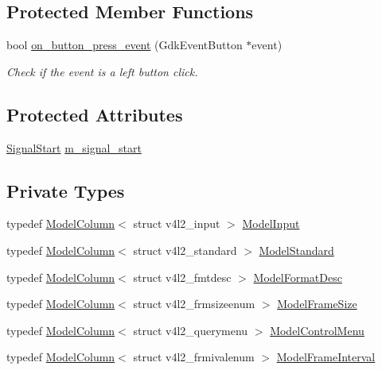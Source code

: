 \subsection*{Protected Member Functions}
\begin{DoxyCompactItemize}
\item 
bool \hyperlink{class_v_s_s_s___g_u_i_1_1_v4_l_interface_adf76dc7c716d55604384a0fd447fdd5d}{on\+\_\+button\+\_\+press\+\_\+event} (Gdk\+Event\+Button $\ast$event)
\begin{DoxyCompactList}\small\item\em Check if the event is a left button click. \end{DoxyCompactList}\end{DoxyCompactItemize}
\subsection*{Protected Attributes}
\begin{DoxyCompactItemize}
\item 
\hyperlink{class_v_s_s_s___g_u_i_1_1_v4_l_interface_aaa97121c9564dbb8c0717725a795ed15}{Signal\+Start} \hyperlink{class_v_s_s_s___g_u_i_1_1_v4_l_interface_a106a19f83b60b118984f3aece410d140}{m\+\_\+signal\+\_\+start}
\end{DoxyCompactItemize}
\subsection*{Private Types}
\begin{DoxyCompactItemize}
\item 
typedef \hyperlink{class_v_s_s_s___g_u_i_1_1_v4_l_interface_1_1_model_column}{Model\+Column}$<$ struct v4l2\+\_\+input $>$ \hyperlink{class_v_s_s_s___g_u_i_1_1_v4_l_interface_a1595c870c26f3848005f8211eeb67b18}{Model\+Input}
\item 
typedef \hyperlink{class_v_s_s_s___g_u_i_1_1_v4_l_interface_1_1_model_column}{Model\+Column}$<$ struct v4l2\+\_\+standard $>$ \hyperlink{class_v_s_s_s___g_u_i_1_1_v4_l_interface_a85b346fe61c675eb9a028a2ca9015dca}{Model\+Standard}
\item 
typedef \hyperlink{class_v_s_s_s___g_u_i_1_1_v4_l_interface_1_1_model_column}{Model\+Column}$<$ struct v4l2\+\_\+fmtdesc $>$ \hyperlink{class_v_s_s_s___g_u_i_1_1_v4_l_interface_a9bb7c5c7917abee18c12e6aaa0c4a880}{Model\+Format\+Desc}
\item 
typedef \hyperlink{class_v_s_s_s___g_u_i_1_1_v4_l_interface_1_1_model_column}{Model\+Column}$<$ struct v4l2\+\_\+frmsizeenum $>$ \hyperlink{class_v_s_s_s___g_u_i_1_1_v4_l_interface_adce6707a83ac1b5cd9dc7ee8b2929475}{Model\+Frame\+Size}
\item 
typedef \hyperlink{class_v_s_s_s___g_u_i_1_1_v4_l_interface_1_1_model_column}{Model\+Column}$<$ struct v4l2\+\_\+querymenu $>$ \hyperlink{class_v_s_s_s___g_u_i_1_1_v4_l_interface_a4aa300e0a5f845ba2d153774035a9d97}{Model\+Control\+Menu}
\item 
typedef \hyperlink{class_v_s_s_s___g_u_i_1_1_v4_l_interface_1_1_model_column}{Model\+Column}$<$ struct v4l2\+\_\+frmivalenum $>$ \hyperlink{class_v_s_s_s___g_u_i_1_1_v4_l_interface_a7813513200948f4605691c33e40e15a9}{Model\+Frame\+Interval}
\end{DoxyCompactItemize}
